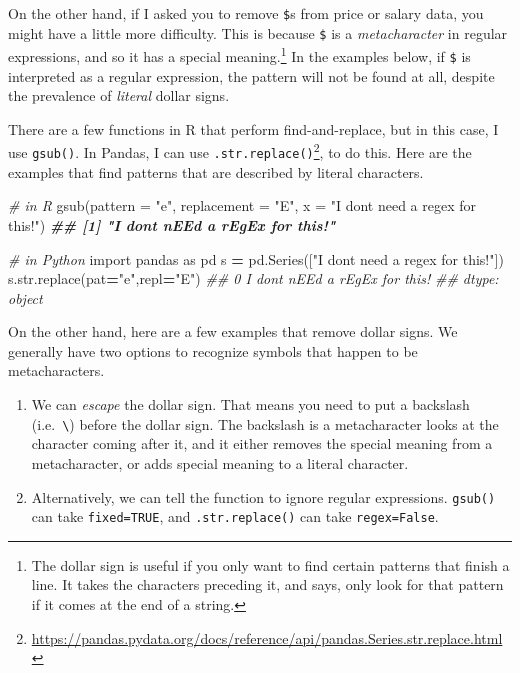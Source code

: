 \documentclass[
  12pt,
  krantz2]{krantz}
\makeatletter
\newenvironment{Shaded}{\begin{snugshade}}{\end{snugshade}}
\newcommand{\AttributeTok}[1]{\textcolor[rgb]{0.61,0.61,0.61}{#1}}
\newcommand{\BuiltInTok}[1]{#1}
\newcommand{\CommentTok}[1]{\textcolor[rgb]{0.37,0.37,0.37}{\textit{#1}}}
\newcommand{\DocumentationTok}[1]{\textcolor[rgb]{0.37,0.37,0.37}{\textbf{\textit{#1}}}}
\newcommand{\FunctionTok}[1]{\textcolor[rgb]{0,0,0}{#1}}
\newcommand{\ImportTok}[1]{#1}
\newcommand{\NormalTok}[1]{#1}
\newcommand{\OperatorTok}[1]{\textcolor[rgb]{0.43,0.43,0.43}{\textbf{#1}}}
\newcommand{\StringTok}[1]{\textcolor[rgb]{0.5,0.5,0.5}{#1}}
\providecommand{\tightlist}{%
  \setlength{\itemsep}{0pt}\setlength{\parskip}{0pt}}
\renewcommand{\href}[2]{#2\footnote{\url{#1}}}
\newenvironment{kframe}{%
\medskip{}
\setlength{\fboxsep}{.8em}
 \def\at@end@of@kframe{}%
 \ifinner\ifhmode%
  \def\at@end@of@kframe{\end{minipage}}%
  \begin{minipage}{\columnwidth}%
 \fi\fi%
 \def\FrameCommand##1{\hskip\@totalleftmargin \hskip-\fboxsep
 \colorbox{shadecolor}{##1}\hskip-\fboxsep
     \hskip-\linewidth \hskip-\@totalleftmargin \hskip\columnwidth}%
 \MakeFramed {\advance\hsize-\width
   \@totalleftmargin\z@ \linewidth\hsize
   \@setminipage}}%
 {\par\unskip\endMakeFramed%
 \at@end@of@kframe}
\renewenvironment{Shaded}{\begin{kframe}}{\end{kframe}}
\makeatother
\begin{document}
On the other hand, if I asked you to remove \texttt{\$}s from price or salary data, you might have a little more difficulty. This is because \texttt{\$} is a \emph{metacharacter} in regular expressions, and so it has a special meaning.\footnote{The dollar sign is useful if you only want to find certain patterns that finish a line. It takes the characters preceding it, and says, only look for that pattern if it comes at the end of a string.} In the examples below, if \texttt{\$} is interpreted as a regular expression, the pattern will not be found at all, despite the prevalence of \emph{literal} dollar signs.

There are a few functions in R that perform find-and-replace, but in this case, I use \texttt{gsub()}. In Pandas, I can use \href{https://pandas.pydata.org/docs/reference/api/pandas.Series.str.replace.html}{\texttt{.str.replace()}}, to do this. Here are the examples that find patterns that are described by literal characters.

\begin{Shaded}
\begin{Highlighting}[]
\CommentTok{\# in R}
\FunctionTok{gsub}\NormalTok{(}\AttributeTok{pattern =} \StringTok{"e"}\NormalTok{, }\AttributeTok{replacement =} \StringTok{"E"}\NormalTok{, }
     \AttributeTok{x =} \StringTok{"I don\textquotesingle{}t need a regex for this!"}\NormalTok{)}
\DocumentationTok{\#\# [1] "I don\textquotesingle{}t nEEd a rEgEx for this!"}
\end{Highlighting}
\end{Shaded}

\begin{Shaded}
\begin{Highlighting}[]
\CommentTok{\# in Python}
\ImportTok{import}\NormalTok{ pandas }\ImportTok{as}\NormalTok{ pd}
\NormalTok{s }\OperatorTok{=}\NormalTok{ pd.Series([}\StringTok{"I don\textquotesingle{}t need a regex for this!"}\NormalTok{])}
\NormalTok{s.}\BuiltInTok{str}\NormalTok{.replace(pat}\OperatorTok{=}\StringTok{"e"}\NormalTok{,repl}\OperatorTok{=}\StringTok{"E"}\NormalTok{)}
\CommentTok{\#\# 0    I don\textquotesingle{}t nEEd a rEgEx for this!}
\CommentTok{\#\# dtype: object}
\end{Highlighting}
\end{Shaded}

On the other hand, here are a few examples that remove dollar signs. We generally have two options to recognize symbols that happen to be metacharacters.

\begin{enumerate}
\def\labelenumi{\arabic{enumi}.}
\tightlist
\item
  We can \emph{escape} the dollar sign. That means you need to put a backslash (i.e.~\texttt{\textbackslash{}}) before the dollar sign. The backslash is a metacharacter looks at the character coming after it, and it either removes the special meaning from a metacharacter, or adds special meaning to a literal character.
\item
  Alternatively, we can tell the function to ignore regular expressions. \texttt{gsub()} can take \texttt{fixed=TRUE}, and \texttt{.str.replace()} can take \texttt{regex=False}.
\end{enumerate}
\end{document}

